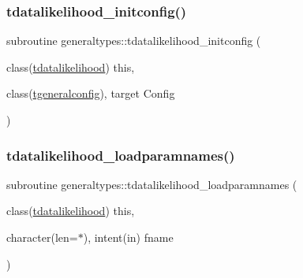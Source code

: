 \subsubsection{\texorpdfstring{tdatalikelihood\+\_\+initconfig()}{tdatalikelihood\_initconfig()}}
{\footnotesize\ttfamily subroutine generaltypes\+::tdatalikelihood\+\_\+initconfig (\begin{DoxyParamCaption}\item[{class(\mbox{\hyperlink{structgeneraltypes_1_1tdatalikelihood}{tdatalikelihood}})}]{this,  }\item[{class(\mbox{\hyperlink{structgeneraltypes_1_1tgeneralconfig}{tgeneralconfig}}), target}]{Config }\end{DoxyParamCaption})\hspace{0.3cm}{\ttfamily [private]}}

\mbox{\label{namespacegeneraltypes_aaea05ea7158416ca57ed2178bdac9431}} 
\subsubsection{\texorpdfstring{tdatalikelihood\+\_\+loadparamnames()}{tdatalikelihood\_loadparamnames()}}
{\footnotesize\ttfamily subroutine generaltypes\+::tdatalikelihood\+\_\+loadparamnames (\begin{DoxyParamCaption}\item[{class(\mbox{\hyperlink{structgeneraltypes_1_1tdatalikelihood}{tdatalikelihood}})}]{this,  }\item[{character(len=$\ast$), intent(in)}]{fname }\end{DoxyParamCaption})\hspace{0.3cm}{\ttfamily [private]}}

\mbox{\label{namespacegeneraltypes_a077299298ffed6e9dea751a27ca45507}} 
